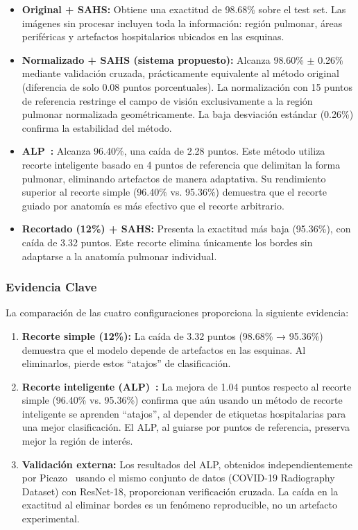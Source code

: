 \begin{itemize}
    \item \textbf{Original + SAHS:} Obtiene una exactitud de 98.68\% sobre el test set. Las imágenes sin procesar incluyen toda la información: región pulmonar, áreas periféricas y artefactos hospitalarios ubicados en las esquinas.

    \item \textbf{Normalizado + SAHS (sistema propuesto):} Alcanza 98.60\% $\pm$ 0.26\% mediante validación cruzada, prácticamente equivalente al método original (diferencia de solo 0.08 puntos porcentuales). La normalización con 15 puntos de referencia restringe el campo de visión exclusivamente a la región pulmonar normalizada geométricamente. La baja desviación estándar (0.26\%) confirma la estabilidad del método.

    \item \textbf{ALP~\cite{picazo2023tesis}:} Alcanza 96.40\%, una caída de 2.28 puntos. Este método utiliza recorte inteligente basado en 4 puntos de referencia que delimitan la forma pulmonar, eliminando artefactos de manera adaptativa. Su rendimiento superior al recorte simple (96.40\% vs. 95.36\%) demuestra que el recorte guiado por anatomía es más efectivo que el recorte arbitrario.

    \item \textbf{Recortado (12\%) + SAHS:} Presenta la exactitud más baja (95.36\%), con caída de 3.32 puntos. Este recorte elimina únicamente los bordes sin adaptarse a la anatomía pulmonar individual.
\end{itemize}

\subsubsection{Evidencia Clave}

La comparación de las cuatro configuraciones proporciona la siguiente evidencia:

\begin{enumerate}
    \item \textbf{Recorte simple (12\%):} La caída de 3.32 puntos (98.68\% → 95.36\%) demuestra que el modelo depende de artefactos en las esquinas. Al eliminarlos, pierde estos ``atajos'' de clasificación.

    \item \textbf{Recorte inteligente (ALP)~\cite{picazo2023tesis}:} La mejora de 1.04 puntos respecto al recorte simple (96.40\% vs. 95.36\%) confirma que aún usando un método de recorte inteligente se aprenden ``atajos'', al depender de etiquetas hospitalarias para una mejor clasificación. El ALP, al guiarse por puntos de referencia, preserva mejor la región de interés.

    \item \textbf{Validación externa:} Los resultados del ALP, obtenidos independientemente por Picazo~\cite{picazo2023tesis} usando el mismo conjunto de datos (COVID-19 Radiography Dataset) con ResNet-18, proporcionan verificación cruzada. La caída en la exactitud al eliminar bordes es un fenómeno reproducible, no un artefacto experimental.
\end{enumerate}

